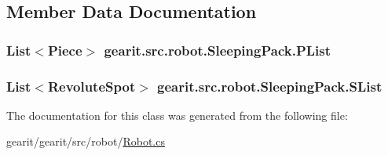 \subsection{Member Data Documentation}
\hypertarget{classgearit_1_1src_1_1robot_1_1_sleeping_pack_ae5a8587cd073d1a8e56d8a3488a58d9d}{
\subsubsection[{P\+List}]{\setlength{\rightskip}{0pt plus 5cm}List$<${\bf Piece}$>$ gearit.\+src.\+robot.\+Sleeping\+Pack.\+P\+List}}\label{classgearit_1_1src_1_1robot_1_1_sleeping_pack_ae5a8587cd073d1a8e56d8a3488a58d9d}
\hypertarget{classgearit_1_1src_1_1robot_1_1_sleeping_pack_a83fcfcdaa7f241258817dbec617c2c40}{
\subsubsection[{S\+List}]{\setlength{\rightskip}{0pt plus 5cm}List$<${\bf Revolute\+Spot}$>$ gearit.\+src.\+robot.\+Sleeping\+Pack.\+S\+List}}\label{classgearit_1_1src_1_1robot_1_1_sleeping_pack_a83fcfcdaa7f241258817dbec617c2c40}


The documentation for this class was generated from the following file\+:\begin{DoxyCompactItemize}
\item 
gearit/gearit/src/robot/\hyperlink{_robot_8cs}{Robot.\+cs}\end{DoxyCompactItemize}
